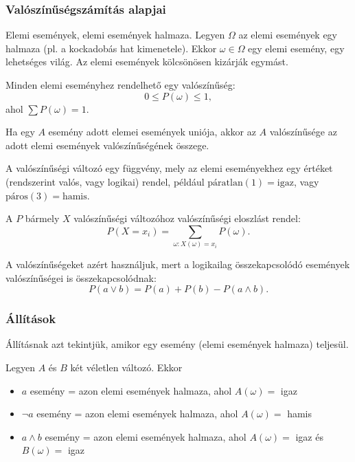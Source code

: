 \subsubsection{Valószínűségszámítás alapjai}

\begin{definicio}
    Elemi események, elemi események halmaza.
    Legyen $\Omega$ az elemi események egy halmaza (pl. a kockadobás hat
    kimenetele).  Ekkor  $\omega \in \Omega$ egy elemi esemény, egy lehetséges
    világ. Az elemi események kölcsönösen kizárják egymást.

    Minden elemi eseményhez rendelhető egy valószínűség: \[
        0 \le P(\omega) \le 1
    ,\] ahol $\sum P(\omega) = 1$.
\end{definicio}

\begin{tetel}
    Ha egy  $A$ esemény adott elemei események uniója, akkor az $A$
    valószínűsége az adott elemi események valószínűségének összege.
\end{tetel}

\begin{definicio}
    A valószínűségi változó egy függvény, mely az elemi eseményekhez
    egy értéket (rendszerint valós, vagy logikai) rendel, például
    $\text{páratlan}(1) = \text{igaz}$, vagy $\text{páros}(3) = \text{hamis}$.

    A $P$ bármely $X$ valószínűségi változóhoz valószínűségi eloszlást rendel:
    \[
        P(X = x_i) = \sum_{\omega : X(\omega) = x_i} P(\omega)
    .\]
\end{definicio}

A valószínűségeket azért használjuk, mert a logikailag összekapcsolódó
események valószínűségei is összekapcsolódnak: \[
    P(a \lor b) = P(a) + P(b) - P(a \land b)
.\]

\subsubsection{Állítások}

Állításnak azt tekintjük, amikor egy esemény (elemi események halmaza)
teljesül.

Legyen $A$ és $B$ két véletlen változó. Ekkor
\begin{itemize}
    \item $a$ esemény = azon elemi események halmaza, ahol $A(\omega) =$ igaz
    \item $\lnot a$ esemény = azon elemi események halmaza, ahol $A(\omega) =$ hamis
    \item $a \land b$ esemény = azon elemi események halmaza, ahol $A(\omega)
        =$ igaz és $B(\omega) =$ igaz
\end{itemize}

